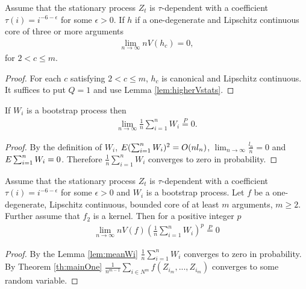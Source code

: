 \begin{lemma}
\label{lem:higherVstats2}
Assume that the stationary process $Z_t$ is $\tau$-dependent with a coefficient $\tau(i) = i^{-6-\epsilon}$ for some $\epsilon>0$. If $h$ if a one-degenerate and Lipschitz continuous core of three or more arguments  
\begin{align}
\lim_{n \to \infty} n V(h_c) = 0,
\end{align}
for $2< c \leq m$.
\end{lemma}
\begin{proof}
For each $c$ satisfying $2< c \leq m$, $h_c$ is canonical and  Lipschitz continuous. It suffices to put $Q=1$ and use Lemma \ref{lem:higherVstats}.
\end{proof}





\begin{lemma}
\label{lem:meanWi}
If $W_i$ is a bootstrap process then
\begin{align}
\lim_{n \to \infty} \frac 1 n \sum_{i=1}^n W_i \overset{P}{=} 0.
\end{align}
\end{lemma}
\begin{proof}
By the definition of $W_i$, $E (\sum_{i=1}^n W_i)^2 = O(n l_n)$,  $\lim_{n \to \infty} \frac {l_n}{n} =0 $ and $E \sum_{i=1}^n W_i = 0$. Therefore $\frac{1} {n} \sum_{i=1}^{n}W_i$ converges to zero in probability.
\end{proof}





\begin{lemma}
\label{lem:toZeroWi}
Assume that the stationary process $Z_t$ is $\tau$-dependent with a coefficient $\tau(i) = i^{-6-\epsilon}$ for some $\epsilon>0$ and $W_i$ is a bootstrap process. Let $f$ be a one-degenerate, Lipschitz continuous, bounded core of at least $m$ arguments, $m \geq 2$. Further assume that $f_2$ is a kernel. Then for a positive integer $p$
\begin{align}
\lim_{n \to \infty } n V(f) \left( \frac 1 n \sum_{i=1}^n W_i \right)^p \overset{P}{=} 0
\end{align}
\end{lemma}

\begin{proof}
By  the Lemma \ref{lem:meanWi} $\frac{1} {n} \sum_{i=1}^{n}W_i$ converges to zero in probability. By Theorem \ref{th:mainOne} $ \frac {1}{n^{m-1}} \sum_{i \in N^m} f(Z_{i_m},...,Z_{i_m}) $ converges to some random variable. 
\end{proof}

